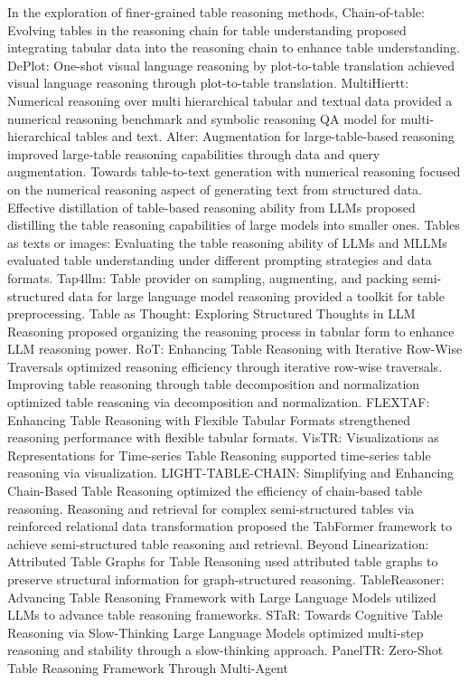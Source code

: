 In the exploration of finer-grained table reasoning methods, Chain-of-table: Evolving tables in the reasoning chain for table understanding \cite{zhang2023chainoftable} proposed integrating tabular data into the reasoning chain to enhance table understanding. DePlot: One-shot visual language reasoning by plot-to-table translation \cite{liu2023deplot} achieved visual language reasoning through plot-to-table translation. MultiHiertt: Numerical reasoning over multi hierarchical tabular and textual data \cite{wang2023multihiertt} provided a numerical reasoning benchmark and symbolic reasoning QA model for multi-hierarchical tables and text. Alter: Augmentation for large-table-based reasoning \cite{kim2023alter} improved large-table reasoning capabilities through data and query augmentation. Towards table-to-text generation with numerical reasoning \cite{gao2023tabletotext} focused on the numerical reasoning aspect of generating text from structured data. Effective distillation of table-based reasoning ability from LLMs \cite{chen2023tablellmdistill} proposed distilling the table reasoning capabilities of large models into smaller ones. Tables as texts or images: Evaluating the table reasoning ability of LLMs and MLLMs \cite{singh2023tablesastext} evaluated table understanding under different prompting strategies and data formats. Tap4llm: Table provider on sampling, augmenting, and packing semi-structured data for large language model reasoning \cite{liu2024tap4llm} provided a toolkit for table preprocessing. Table as Thought: Exploring Structured Thoughts in LLM Reasoning \cite{huang2023tableasthought} proposed organizing the reasoning process in tabular form to enhance LLM reasoning power. RoT: Enhancing Table Reasoning with Iterative Row-Wise Traversals \cite{xu2023rot} optimized reasoning efficiency through iterative row-wise traversals. Improving table reasoning through table decomposition and normalization \cite{li2023tabulardecompose} optimized table reasoning via decomposition and normalization. FLEXTAF: Enhancing Table Reasoning with Flexible Tabular Formats \cite{wang2024flextaf} strengthened reasoning performance with flexible tabular formats. VisTR: Visualizations as Representations for Time-series Table Reasoning \cite{zhang2024vistr} supported time-series table reasoning via visualization. LIGHT-TABLE-CHAIN: Simplifying and Enhancing Chain-Based Table Reasoning \cite{chen2024lighttablechain} optimized the efficiency of chain-based table reasoning. Reasoning and retrieval for complex semi-structured tables via reinforced relational data transformation \cite{liu2023tabformer} proposed the TabFormer framework to achieve semi-structured table reasoning and retrieval. Beyond Linearization: Attributed Table Graphs for Table Reasoning \cite{gao2024attributedtablegraph} used attributed table graphs to preserve structural information for graph-structured reasoning. TableReasoner: Advancing Table Reasoning Framework with Large Language Models \cite{singh2024tablereasoner} utilized LLMs to advance table reasoning frameworks. STaR: Towards Cognitive Table Reasoning via Slow-Thinking Large Language Models \cite{wang2024starcognitive} optimized multi-step reasoning and stability through a slow-thinking approach. PanelTR: Zero-Shot Table Reasoning Framework Through Multi-Agent 